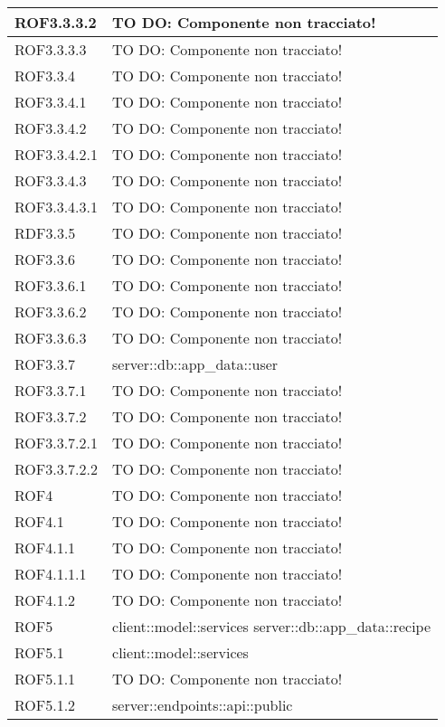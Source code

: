 \begin{center}
\begin{longtable}{| p{4cm} | p{8cm} |}
\hline
ROF3.3.3.2 & TO DO: Componente non tracciato! \\
\hline
ROF3.3.3.3 & TO DO: Componente non tracciato! \\
\hline
ROF3.3.4 & TO DO: Componente non tracciato! \\
\hline
ROF3.3.4.1 & TO DO: Componente non tracciato! \\
\hline
ROF3.3.4.2 & TO DO: Componente non tracciato! \\
\hline
ROF3.3.4.2.1 & TO DO: Componente non tracciato! \\
\hline
ROF3.3.4.3 & TO DO: Componente non tracciato! \\
\hline
ROF3.3.4.3.1 & TO DO: Componente non tracciato! \\
\hline
RDF3.3.5 & TO DO: Componente non tracciato! \\
\hline
ROF3.3.6 & TO DO: Componente non tracciato! \\
\hline
ROF3.3.6.1 & TO DO: Componente non tracciato! \\
\hline
ROF3.3.6.2 & TO DO: Componente non tracciato! \\
\hline
ROF3.3.6.3 & TO DO: Componente non tracciato! \\
\hline
ROF3.3.7 & server::db::app\_data::user \\
\hline
ROF3.3.7.1 & TO DO: Componente non tracciato! \\
\hline
ROF3.3.7.2 & TO DO: Componente non tracciato! \\
\hline
ROF3.3.7.2.1 & TO DO: Componente non tracciato! \\
\hline
ROF3.3.7.2.2 & TO DO: Componente non tracciato! \\
\hline
ROF4 & TO DO: Componente non tracciato! \\
\hline
ROF4.1 & TO DO: Componente non tracciato! \\
\hline
ROF4.1.1 & TO DO: Componente non tracciato! \\
\hline
ROF4.1.1.1 & TO DO: Componente non tracciato! \\
\hline
ROF4.1.2 & TO DO: Componente non tracciato! \\
\hline
ROF5 & client::model::services \newline server::db::app\_data::recipe \\
\hline
ROF5.1 & client::model::services \\
\hline
ROF5.1.1 & TO DO: Componente non tracciato! \\
\hline
ROF5.1.2 & server::endpoints::api::public \\

\end{longtable}
\end{center}
